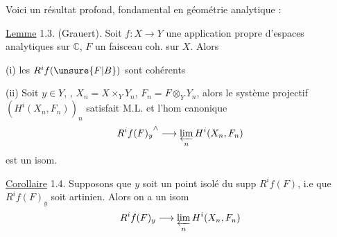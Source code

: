 Voici un résultat  profond, fondamental  en géométrie analytique :

\uline{Lemme} 1.3. (Grauert). Soit $f:X\longrightarrow Y$ une application propre d'espaces analytiques sur $\mathbb C$, $F$ un faisceau coh. sur $X$. Alors

(i) les $R^if(\unsure{F|B})$ sont cohérents

(ii) Soit $y\in Y$, , $X_n=X\times_Y Y_n$, $F_n=F\otimes_Y Y_n$, alors le système projectif $(H^i(X_n,F_n))_n$ satisfait M.L. et l'hom canonique
\[
{R^if(F)_y}^{\wedge}\longrightarrow\varprojlim_n H^i(X_n,F_n)
\]
est un isom.

\uline{Corollaire} 1.4. Supposons que $y$ soit un point isolé du supp $R^if(F)$,  i.e que $R^if(F)_y$ soit artinien. Alors on a un isom
\[
R^if(F)_y\longrightarrow\varprojlim_n H^i(X_n,F_n)
\]

